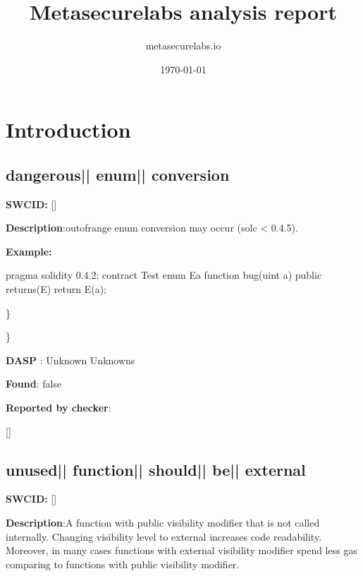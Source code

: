 \documentclass{article}
\title{Metasecurelabs analysis report}
\author{metasecurelabs.io }
\date{\today}
\begin{document}
 

\maketitle 

\section{Introduction} 
\subsection{dangerous{|\textunderscore| }enum{|\textunderscore| }conversion} 
\textbf{SWC{\textunderscore }ID:} []

\textbf{Description}:out{\textendash}of{\textendash}range enum conversion may occur (solc < 0.4.5).


\textbf{Example:} 
\begin{ffcode} 

pragma solidity 0.4.2;
contract Test{
  enum E{a}
  function bug(uint a) public returns(E){
        return E(a);
    }
}

\end{ffcode} 
\} 

\} 

\textbf{DASP} : Unknown Unknowns

\textbf{Found}: false

\textbf{Reported by checker}: 
\begin{ffcode} 

[]
\end{ffcode} 
\subsection{unused{|\textunderscore| }function{|\textunderscore| }should{|\textunderscore| }be{|\textunderscore| }external} 
\textbf{SWC{\textunderscore }ID:} []

\textbf{Description}:A function with public visibility modifier that is not called internally. Changing visibility level to external increases code readability. Moreover, in many cases functions with external visibility modifier spend less gas comparing to functions with public visibility modifier.
\end{document}
